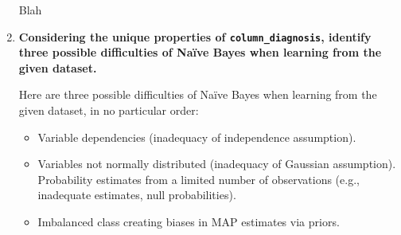 \documentclass[12pt]{article}
\begin{document}
\begin{enumerate}[leftmargin=\labelsep]
          Blah %

    \item \textbf{Considering the unique properties of \texttt{column\_diagnosis}, identify three possible difficulties
          of Naïve Bayes when learning from the given dataset.}

          \vskip 0.3cm
          Here are three possible difficulties of Naïve Bayes when learning from the given dataset,
          in no particular order:

          \begin{itemize}
              \item Variable dependencies (inadequacy of independence assumption).
              \item Variables not normally distributed (inadequacy of Gaussian assumption). Probability estimates from a limited number of observations (e.g., inadequate estimates, null probabilities).
              \item Imbalanced class creating biases in MAP estimates via priors.
          \end{itemize}
\end{enumerate}
\end{document}

